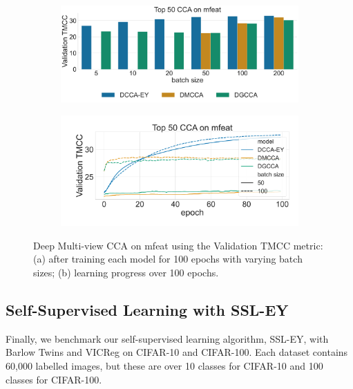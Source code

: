 \begin{figure}
    \centering
    \begin{subfigure}[b]{0.49\textwidth}
        \centering
        \includegraphics[width=\textwidth]{figures/DMCCA/mfeat_models_different_batch_sizes}
        \caption{}\label{fig:dmcca_corr}
    \end{subfigure}
    \hfill
    \begin{subfigure}[b]{0.49\textwidth}
        \centering
        \includegraphics[width=\textwidth]{figures/DMCCA/mfeat_allbatchsizes_pcc}
        \caption{}\label{fig:dmcca_lr}
    \end{subfigure}
    \caption{Deep Multi-view CCA on mfeat using the Validation TMCC metric: (a) after training each model for 100 epochs with varying batch sizes; (b) learning progress over 100 epochs.}
    \label{fig:dmcca}
\end{figure}

\subsection{Self-Supervised Learning with SSL-EY}
Finally, we benchmark our self-supervised learning algorithm, SSL-EY, with Barlow Twins and VICReg on CIFAR-10 and CIFAR-100. Each dataset contains 60,000 labelled images, but these are over 10 classes for CIFAR-10 and 100 classes for CIFAR-100.

